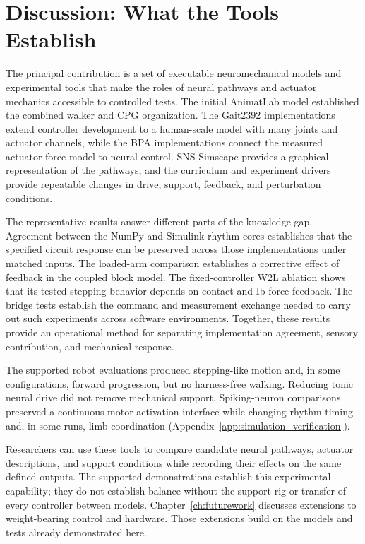\section{Discussion: What the Tools Establish}\label{sec:sns_discussion}

The principal contribution is a set of executable neuromechanical models and experimental tools that make the roles of neural pathways and actuator mechanics accessible to controlled tests. The initial AnimatLab model established the combined walker and CPG organization. The Gait2392 implementations extend controller development to a human-scale model with many joints and actuator channels, while the BPA implementations connect the measured actuator-force model to neural control. SNS-Simscape provides a graphical representation of the pathways, and the curriculum and experiment drivers provide repeatable changes in drive, support, feedback, and perturbation conditions.

The representative results answer different parts of the knowledge gap. Agreement between the NumPy and Simulink rhythm cores establishes that the specified circuit response can be preserved across those implementations under matched inputs. The loaded-arm comparison establishes a corrective effect of feedback in the coupled block model. The fixed-controller W2L ablation shows that its tested stepping behavior depends on contact and Ib-force feedback. The bridge tests establish the command and measurement exchange needed to carry out such experiments across software environments. Together, these results provide an operational method for separating implementation agreement, sensory contribution, and mechanical response.

The supported robot evaluations produced stepping-like motion and, in some configurations, forward progression, but no harness-free walking. Reducing tonic neural drive did not remove mechanical support. Spiking-neuron comparisons preserved a continuous motor-activation interface while changing rhythm timing and, in some runs, limb coordination (Appendix~\ref{app:simulation_verification}).

Researchers can use these tools to compare candidate neural pathways, actuator descriptions, and support conditions while recording their effects on the same defined outputs. The supported demonstrations establish this experimental capability; they do not establish balance without the support rig or transfer of every controller between models. Chapter~\ref{ch:futurework} discusses extensions to weight-bearing control and hardware. Those extensions build on the models and tests already demonstrated here.